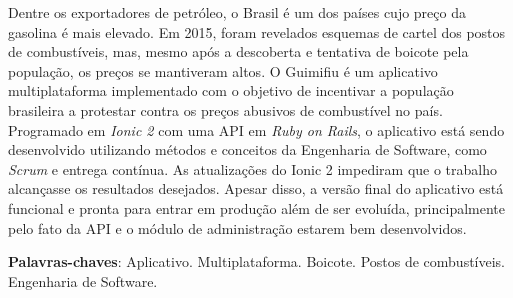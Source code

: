\begin{resumo}

Dentre os exportadores de petróleo, o Brasil é um dos países cujo preço da gasolina é mais elevado. Em 2015, foram revelados esquemas de cartel dos postos de combustíveis, mas, mesmo após a descoberta e tentativa de boicote pela população, os preços se mantiveram altos. O Guimifiu é um aplicativo multiplataforma implementado com o objetivo de incentivar a população brasileira a protestar contra os preços abusivos de combustível no país. Programado em \textit{Ionic 2} com uma API em \textit{Ruby on Rails}, o aplicativo está sendo desenvolvido utilizando métodos e conceitos da Engenharia de Software, como \textit{Scrum} e entrega contínua. As atualizações do Ionic 2 impediram que o trabalho alcançasse os resultados desejados. Apesar disso, a versão final do aplicativo está funcional e pronta para entrar em produção além de ser evoluída, principalmente pelo fato da API e o módulo de administração estarem bem desenvolvidos.

 \vspace{\onelineskip}

 \noindent
 \textbf{Palavras-chaves}: Aplicativo. Multiplataforma. Boicote. Postos de combustíveis. Engenharia de Software. 
\end{resumo}
